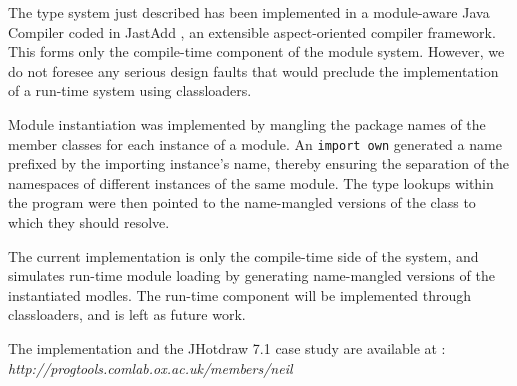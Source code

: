 The type system just described has been implemented in a
module-aware Java Compiler coded in JastAdd \cite{jastadd},
an extensible aspect-oriented compiler framework. This forms
only the compile-time component of the module system. However,
we do not foresee any serious design faults that would preclude
the implementation of a run-time system using classloaders.

Module instantiation was implemented by mangling
the package names of the member classes for each instance of 
a module. An \texttt{import own} generated a name prefixed by 
the importing instance's name, thereby ensuring the separation
of the namespaces of different instances of the same module.
The type lookups within the program were then pointed to the
name-mangled versions of the class to which they should resolve.

The current implementation is only the compile-time side of
the system, and simulates run-time module loading by generating 
name-mangled versions of the instantiated modles. 
The run-time component will be implemented through
classloaders, and is left as future work.

The implementation and the JHotdraw 7.1 case study are available at : 
\textit{http://progtools.comlab.ox.ac.uk/members/neil}










